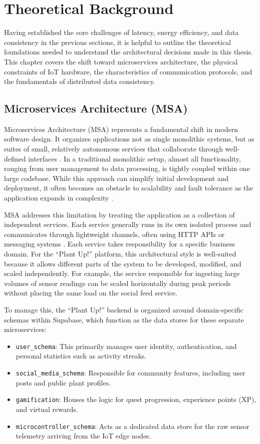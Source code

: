 \section{Theoretical Background}

Having established the core challenges of latency, energy efficiency, and data consistency in the previous sections, it is helpful to outline the theoretical foundations needed to understand the architectural decisions made in this thesis. This chapter covers the shift toward microservices architecture, the physical constraints of IoT hardware, the characteristics of communication protocols, and the fundamentals of distributed data consistency.

\subsection{Microservices Architecture (MSA)}
Microservices Architecture (MSA) represents a fundamental shift in modern software design. It organizes applications not as single monolithic systems, but as suites of small, relatively autonomous services that collaborate through well-defined interfaces \cite{fowlerMicroservices}. In a traditional monolithic setup, almost all functionality, ranging from user management to data processing, is tightly coupled within one large codebase. While this approach can simplify initial development and deployment, it often becomes an obstacle to scalability and fault tolerance as the application expands in complexity \cite{newmanBuilding}.

MSA addresses this limitation by treating the application as a collection of independent services. Each service generally runs in its own isolated process and communicates through lightweight channels, often using HTTP APIs or messaging systems \cite{newmanBuilding}. Each service takes responsibility for a specific business domain. For the ``Plant Up!'' platform, this architectural style is well-suited because it allows different parts of the system to be developed, modified, and scaled independently. For example, the service responsible for ingesting large volumes of sensor readings can be scaled horizontally during peak periods without placing the same load on the social feed service.

To manage this, the ``Plant Up!'' backend is organized around domain-specific schemas within Supabase, which function as the data stores for these separate microservices:
\begin{itemize}
    \item \texttt{user\_schema}: This primarily manages user identity, authentication, and personal statistics such as activity streaks.
    \item \texttt{social\_media\_schema}: Responsible for community features, including user posts and public plant profiles.
    \item \texttt{gamification}: Houses the logic for quest progression, experience points (XP), and virtual rewards.
    \item \texttt{microcontroller\_schema}: Acts as a dedicated data store for the raw sensor telemetry arriving from the IoT edge nodes.
\end{itemize}

